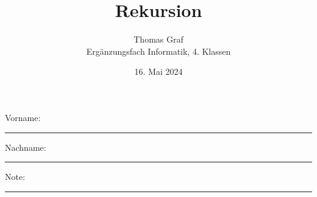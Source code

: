 \newtoggle{withbonus} \toggletrue{withbonus} %
\lstset{style=Python}

\newcommand{\mycourse}{Ergänzungsfach Informatik}
\newcommand{\myclass}{4. Klassen}
\newcommand{\mydate}{16. Mai 2024}

\title{\textbf{Rekursion}}
\author{Thomas Graf\\
\mycourse, \myclass}
\date{\mydate}
\maketitle
\thispagestyle{headandfoot}		

\begin{center}
\end{center}
\vspace{10mm}

\begin{center}
	Vorname: \rule{45mm}{0.8pt}\qquad Nachname: \rule{45mm}{0.8pt}
\end{center}
\vspace{20mm}

\begin{center}
	\iftoggle{withbonus} {
		\combinedgradetable[h][questions]
	} {
		\gradetable[h][questions]
	}
\end{center}
\vspace{15mm}
\begin{center}
	Note: 
	\vspace{10mm}
	
	\rule{8mm}{1.2pt}
\end{center}
\clearpage


